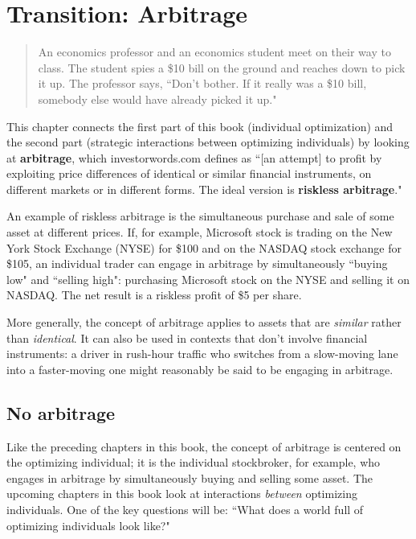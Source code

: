 \chapter{Transition: Arbitrage}
\label{1transition}

\begin{quote} An economics professor and an economics student meet on their way to class. The student spies a \$10 bill on the ground and reaches down to pick it up. The professor says, ``Don't bother. If it really was a \$10 bill, somebody else would have already picked it up."
\end{quote}

\vspace*{.4cm}

\noindent This chapter connects the first part of this book (individual optimization) and the second part (strategic interactions between optimizing individuals) by looking at \textbf{arbitrage}, which investorwords.com defines as ``[an attempt] to profit by exploiting price differences of identical or similar financial instruments, on different markets or in different forms. The ideal version is \textbf{riskless arbitrage}."

An example of riskless arbitrage is the simultaneous purchase and sale of some asset at different prices. If, for example, Microsoft stock is trading on the New York Stock Exchange (NYSE) for \$100 and on the NASDAQ stock exchange for \$105, an individual trader can engage in arbitrage by simultaneously ``buying low" and ``selling high": purchasing Microsoft stock on the NYSE and selling it on NASDAQ. The net result is a riskless profit of \$5 per share.

More generally, the concept of arbitrage applies to assets that are \emph{similar} rather than \emph{identical}. It can also be used in contexts that don't involve financial instruments: a driver in rush-hour traffic who switches from a slow-moving lane into a faster-moving one  might reasonably be said to be engaging in arbitrage.

\section{No arbitrage}

Like the preceding chapters in this book, the concept of arbitrage is centered on the optimizing individual; it is the individual stockbroker, for example, who engages in arbitrage by simultaneously buying and selling some asset. The upcoming chapters in this book look at interactions \emph{between} optimizing individuals. One of the key questions will be: ``What does a world full of optimizing individuals look like?"

